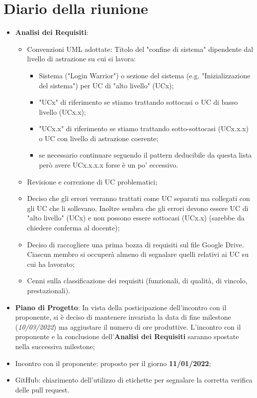 \section{Diario della riunione}
\begin{itemize}
  \item \textbf{Analisi dei Requisiti}: 
  \begin{itemize}
    \item Convenzioni UML adottate: Titolo del "confine di sistema" dipendente dal livello di astrazione su cui si lavora:
    \begin{itemize}
      \item Sistema ("Login Warrior") o sezione del sistema (e.g. "Inizializzazione del sistema") per UC di "alto livello" (UCx);
      \item "UCx" di riferimento se stiamo trattando sottocasi o UC di basso livello (UCx.x);
      \item "UCx.x" di riferimento se stiamo trattando sotto-sottocasi (UCx.x.x) o UC con livello di astrazione coerente;
      \item se necessario continuare seguendo il pattern deducibile da questa lista però avere UCx.x.x.x forse è un po' eccessivo. 
    \end{itemize}
    \item Revisione e correzione di UC problematici;
    \item Deciso che gli errori verranno trattati come UC separati ma collegati con gli UC che li sollevano. Inoltre sembra che gli errori devono essere UC di "alto livello" (UCx) e non possono essere sottocasi (UCx.x) (sarebbe da chiedere conferma al docente);
    \item Deciso di raccogliere una prima bozza di requisiti sul file Google Drive. Ciascun membro si occuperà almeno di segnalare quelli relativi ai UC su cui ha lavorato;
    \item Cenni sulla classificazione dei requisiti (funzionali, di qualità, di vincolo, prestazionali).
  \end{itemize}
  \item \textbf{Piano di Progetto}: In vista della posticipazione dell'incontro con il proponente, si è deciso di mantenere invariata la data di fine milestone (\textit{10/03/2022}) ma aggiustare il numero di ore produttive. L'incontro con il proponente e la conclusione dell'\textbf{Analisi dei Requisiti} saranno spostate nella successiva milestone;
  \item Incontro con il proponente: proposto per il giorno \textbf{11/01/2022};
  \item GitHub: chiarimento dell'utilizzo di etichette per segnalare la corretta verifica delle pull request.  
\end{itemize}

